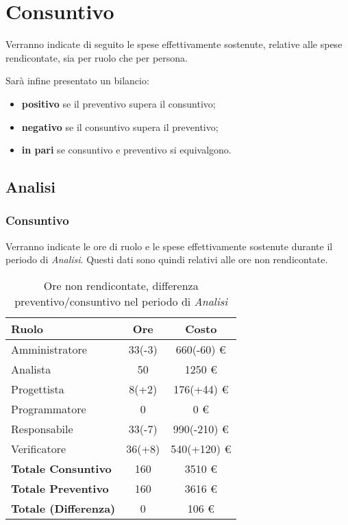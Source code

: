 \section{Consuntivo}
Verranno indicate di seguito le spese effettivamente sostenute, relative alle spese rendicontate, sia per ruolo che per persona.

Sar\`a infine presentato un bilancio:
\begin{itemize}
\item \textbf{positivo} se il preventivo supera il consuntivo;
\item \textbf{negativo} se il consuntivo supera il preventivo;
\item \textbf{in pari} se consuntivo e preventivo si equivalgono.
\end{itemize}


\subsection{Analisi}
\subsubsection{Consuntivo}
Verranno indicate le ore di ruolo e le spese effettivamente sostenute durante il periodo di \textit{Analisi}. Questi dati sono quindi relativi alle ore non rendicontate.

\begin{table}[H]
	\centering
	\begin{tabular}{ l c c }
		\textbf{Ruolo} & \textbf{Ore} & \textbf{Costo} \\
		\hline
		Amministratore & 33(-3) & 660(-60) \euro{} \\
		Analista & 50 & 1250 \euro{} \\
		Progettista & 8(+2) & 176(+44) \euro{} \\
		Programmatore & 0 & 0 \euro{} \\
		Responsabile & 33(-7) & 990(-210) \euro{} \\
		Verificatore & 36(+8) & 540(+120) \euro{} \\
		\hline
		\textbf{Totale Consuntivo} & 160 & 3510 \euro{} \\
		\hline
		\textbf{Totale Preventivo} & 160 & 3616 \euro{} \\
		\hline
		\textbf{Totale (Differenza)} & 0 & 106 \euro{} \\
		\hline
	\end{tabular}
	\caption{Ore non rendicontate, differenza preventivo/consuntivo nel periodo di \textit{Analisi}}
\end{table}



